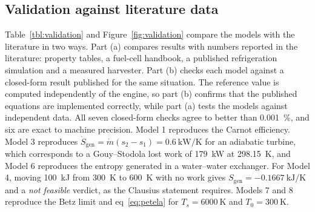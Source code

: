 \documentclass[journal=iecred,manuscript=article,layout=twocolumn,email=false]{achemso}
\begin{document}
\subsection{Validation against literature data}
Table~\ref{tbl:validation} and Figure~\ref{fig:validation} compare the models with the literature in two ways. Part
(a) compares results with numbers reported in the literature: property tables, a fuel-cell handbook, a published
refrigeration simulation and a measured harvester. Part (b) checks each model against a closed-form result published
for the same situation. The reference value is computed independently of the engine, so part (b) confirms that the
published equations are implemented correctly, while part (a) tests the models against independent data. All seven
closed-form checks agree to better than \SI{0.001}{\percent}, and six are exact to machine precision. Model 1
reproduces the Carnot efficiency. Model 3 reproduces $\dot S_\mathrm{gen}=\dot m(s_2-s_1)=\SI{0.6}{\kilo\watt\per\kelvin}$ for an adiabatic
turbine, which corresponds to a Gouy--Stodola lost work of \SI{179}{\kilo\watt} at \SI{298.15}{\kelvin},\cite{Pal2017}
and Model 6 reproduces the entropy generated in a water--water exchanger. For Model 4, moving \SI{100}{\kilo\joule} from
\SI{300}{\kelvin} to \SI{600}{\kelvin} with no work gives $S_\mathrm{gen}=-\SI{0.1667}{\kilo\joule\per\kelvin}$ and a
\emph{not feasible} verdict, as the Clausius statement requires.\cite{Xue2019} Models 7 and 8 reproduce the Betz
limit\cite{Betz1920} and eq~\ref{eq:petela} for $T_s=\SI{6000}{\kelvin}$ and $T_0=\SI{300}{\kelvin}$.\cite{Petela2003}
\end{document}
